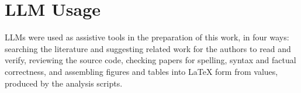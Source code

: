 \section*{LLM Usage}
LLMs were used as assistive tools in the preparation of this work,
in four ways:
searching the literature and suggesting related work for the authors to read and verify,
reviewing the source code,
checking papers for spelling,
syntax and factual correctness,
and assembling figures and tables into \LaTeX{} form from values,
produced by the analysis scripts.
